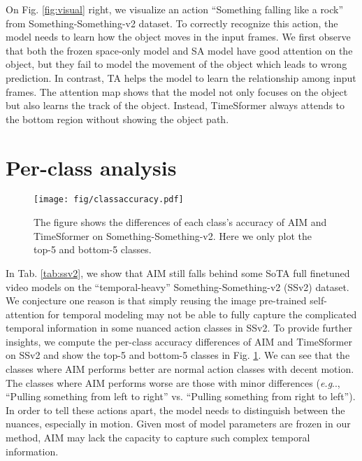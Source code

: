 \documentclass{article} \usepackage{iclr2023_conference,times}
\makeatletter
\DeclareRobustCommand\onedot{\futurelet\@let@token\@onedot}
\def\@onedot{\ifx\@let@token.\else.\null\fi\xspace}
\def\eg{\emph{e.g}\onedot} \def\Eg{\emph{E.g}\onedot}
\makeatother
\begin{document}
	On Fig. \ref{fig:visual} right, we visualize an action ``Something falling like a rock'' from Something-Something-v2 dataset. 
To correctly recognize this action, the model needs to learn how the object moves in the input frames. 
	We first observe that both the frozen space-only model and SA model have good attention on the object, but they fail to model the movement of the object which leads to wrong prediction. 
	In contrast, TA helps the model to learn the relationship among input frames.
The attention map shows that the model not only focuses on the object but also learns the track of the object. 
	Instead, TimeSformer always attends to the bottom region without showing the object path. 


	\section{Per-class analysis}
	\begin{figure}
		\centering
		\texttt{[image: fig/classaccuracy.pdf]}
\caption{The figure shows the differences of each class's accuracy of AIM and TimeSformer on Something-Something-v2. Here we only plot the top-5 and bottom-5 classes.}
		\label{fig:classaccuracy}
\end{figure}
	
	In Tab. \ref{tab:ssv2}, we show that AIM still falls behind some SoTA full finetuned video models on the ``temporal-heavy'' Something-Something-v2 (SSv2) dataset. We conjecture one reason is that simply reusing the image pre-trained self-attention for temporal modeling may not be able to fully capture the complicated temporal information in some nuanced action classes in SSv2. 
	To provide further insights, we compute the per-class accuracy differences of AIM and TimeSformer on SSv2 and show the top-5 and bottom-5 classes in Fig. \ref{fig:classaccuracy}. 
	We can see that the classes where AIM performs better are normal action classes with decent motion. 
	The classes where AIM performs worse are those with minor differences (\eg, ``Pulling something from left to right'' vs. ``Pulling something from right to left''). 
	In order to tell these actions apart, the model needs to distinguish between the nuances, especially in motion. 
	Given most of model parameters are frozen in our method, AIM may lack the capacity to capture such complex temporal information.
	
\end{document}
